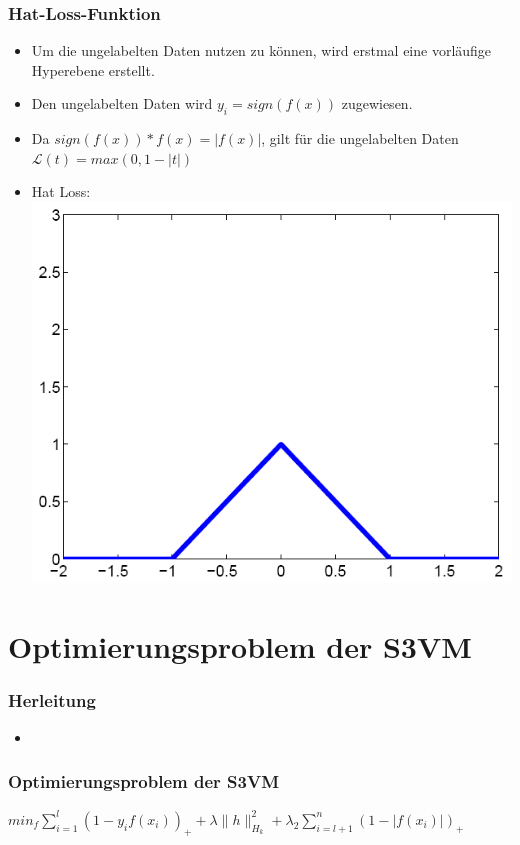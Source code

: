 \documentclass{beamer}
\begin{document}
\begin{frame}
\frametitle{Hat-Loss-Funktion}
    \begin{itemize}
        \item Um die ungelabelten Daten nutzen zu k\"onnen, wird erstmal eine vorl\"aufige Hyperebene erstellt.
        \item Den ungelabelten Daten wird $y_i = sign(f(x))$ zugewiesen. 
        \item Da $sign(f(x))*f(x) = |f(x)|$, gilt f\"ur die ungelabelten Daten $\mathcal{L}(t) = max(0, 1-|t|)$
        \item Hat Loss: \includegraphics[scale=0.2]{img/hat_loss_function.png}
    \end{itemize}
\end{frame}




\section{Optimierungsproblem der S3VM}

\begin{frame}
\frametitle{Herleitung}
        \begin{itemize}
            \item 
        \end{itemize}
\end{frame}

\begin{frame}
\frametitle{Optimierungsproblem der S3VM}
    $min_f \sum_{i=1}^l (1-y_i f(x_i))_+ + \lambda \|h\|^2_{H_k} + \lambda_2 \sum_{i=l+1}^n (1- |f(x_i)|)_+$
\end{frame}
\end{document}
